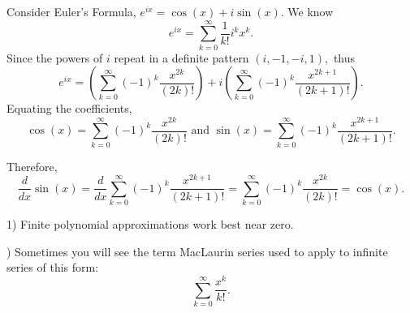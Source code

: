 \bigskip \noindent Consider Euler's Formula, $e^{ix} = \cos(x) + i\sin(x).$ We know \[e^{ix} = \sum_{k = 0}^{\infty} \frac{1}{k!}i^{k}x^{k}.\] Since the powers of $i$ repeat in a definite pattern $(i, -1, -i, 1),$ thus \[e^{ix} = \left(\sum_{k = 0}^{\infty} (-1)^{k}\frac{x^{2k}}{(2k)!}\right) + i\left(\sum_{k = 0}^{\infty} (-1)^{k}\frac{x^{2k + 1}}{(2k + 1)!}\right).\] Equating the coefficients, \[\cos(x) = \sum_{k = 0}^{\infty} (-1)^{k}\frac{x^{2k}}{(2k)!} \text{ and } \sin(x) = \sum_{k = 0}^{\infty} (-1)^{k}\frac{x^{2k + 1}}{(2k + 1)!}.\] 

\bigskip \noindent Therefore, \[\frac{d}{dx} \sin(x) = \frac{d}{dx} \sum_{k = 0}^{\infty} (-1)^{k}\frac{x^{2k + 1}}{(2k + 1)!} = \sum_{k = 0}^{\infty} (-1)^{k}\frac{x^{2k}}{(2k)!} = \cos(x).\] 

\begin{remark}
1) Finite polynomial approximations work best near zero.

\bigskip {}) Sometimes you will see the term MacLaurin series used to apply to infinite series of this form: \[\sum_{k = 0}^{\infty} \frac{x^{k}}{k!}.\]
\end{remark}
